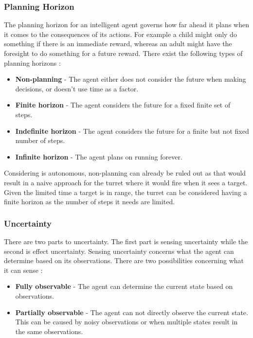 \subsubsection{Planning Horizon}
The planning horizon for an intelligent agent governs how far ahead it plans
when it comes to the consequences of its actions. For example a child might
only do something if there is an immediate reward, whereas an adult might have
the foresight to do something for a future reward. There
exist the following types of planning horizons \citep[ch.1.5.3]{MIBook}:
\begin{itemize}
	\item \textbf{Non-planning} - The agent either does not consider the
	future when making decisions, or doesn't use time as a factor.
	\item \textbf{Finite horizon} - The agent considers the future for a fixed
	finite set of steps. 
	\item \textbf{Indefinite horizon} - The agent considers the future for a
	finite but not fixed number of steps.
	\item \textbf{Infinite horizon} - The agent plans on running forever.	
\end{itemize}

Considering \name is autonomous, non-planning can already be ruled
out as that would result in a naive approach for the turret where it
would fire when it sees a target. Given the limited time a target is in range,
the turret can be considered having a finite horizon as the number of steps it
needs are limited.

\subsubsection{Uncertainty}
There are two parts to uncertainty. The first part is sensing uncertainty while
the second is effect uncertainty. Sensing uncertainty concerns what the agent
can determine based on its observations. There are two possibilities concerning
what it can sense \citep[ch.1.5.4]{MIBook}:
\begin{itemize}
  \item \textbf{Fully observable} - The agent can determine the current state
  based on observations.
  \item \textbf{Partially observable} - The agent can not directly observe
  the current state. This can be caused by noisy observations or when multiple
  states result in the same observations.
\end{itemize}

